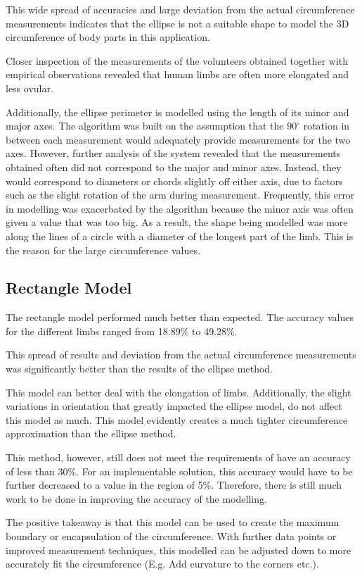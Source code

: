 This wide spread of accuracies and large deviation from the actual circumference measurements indicates that the ellipse is not a suitable shape to model the 3D circumference of body parts in this application.

Closer inspection of the measurements of the volunteers obtained together with empirical observations revealed that human limbs are often more elongated and less ovular. 

Additionally, the ellipse perimeter is modelled using the length of its minor and major axes. The algorithm was built on the assumption that the $90^{\circ}$ rotation in between each measurement would adequately provide measurements for the two axes. However, further analysis of the system revealed that the measurements obtained often did not correspond to the major and minor axes. Instead, they would correspond to diameters or chords slightly off either axis, due to factors such as the slight rotation of the arm during measurement. Frequently, this error in modelling was exacerbated by the algorithm because the minor axis was often given a value that was too big. As a result, the shape being modelled was more along the lines of a circle with a diameter of the longest part of the limb. This is the reason for the large circumference values.  

\subsection{Rectangle Model}
The rectangle model performed much better than expected. The accuracy values for the different limbs ranged from 18.89\% to 49.28\%.

This spread of results and deviation from the actual circumference measurements was significantly better than the results of the ellipse method.

This model can better deal with the elongation of limbs. Additionally, the slight variations in orientation that greatly impacted the ellipse model, do not affect this model as much. This model evidently creates a much tighter circumference approximation than the ellipse method. 

This method, however, still does not meet the requirements of have an accuracy of less than 30\%. For an implementable solution, this accuracy would have to be further decreased to a value in the region of 5\%. Therefore, there is still much work to be done in improving the accuracy of the modelling. 

The positive takeaway is that this model can be used to create the maximum boundary or encapsulation of the circumference. With further data points or improved measurement techniques, this modelled can be adjusted down to more accurately fit the circumference (E.g. Add curvature to the corners etc.). 


